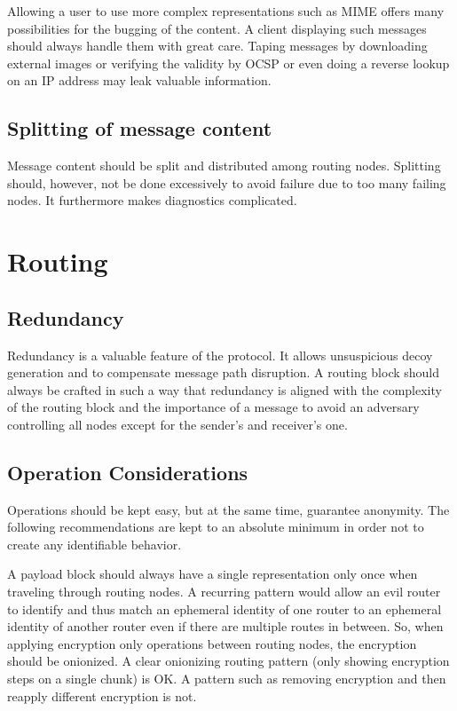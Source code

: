 Allowing a user to use more complex representations such as MIME offers many possibilities for the bugging of the content. A client displaying such messages should always handle them with great care. Taping messages by downloading external images or verifying the validity by OCSP or even doing a reverse lookup on an IP address may leak valuable information.

\subsection{Splitting of message content}
Message content should be split and distributed among routing nodes. Splitting should, however, not be done excessively to avoid failure due to too many failing nodes. It furthermore makes diagnostics complicated. 

\section{Routing}
\subsection{Redundancy}
Redundancy is a valuable feature of the protocol. It allows unsuspicious decoy generation and to compensate message path disruption. A routing block should always be crafted in such a way that redundancy is aligned with the complexity of the routing block and the importance of a message to avoid an adversary controlling all nodes except for the sender's and receiver's one.

\subsection{Operation Considerations}
Operations should be kept easy, but at the same time, guarantee anonymity. The following recommendations are kept to an absolute minimum in order not to create any identifiable behavior.

A payload block should always have a single representation only once when traveling through routing nodes. A recurring pattern would allow an evil router to identify and thus match an ephemeral identity of one router to an ephemeral identity of another router even if there are multiple routes in between. So, when applying encryption only operations between routing nodes, the encryption should be onionized. A clear onionizing routing pattern (only showing encryption steps on a single chunk) is OK. A pattern such as removing encryption and then reapply different encryption is not.

